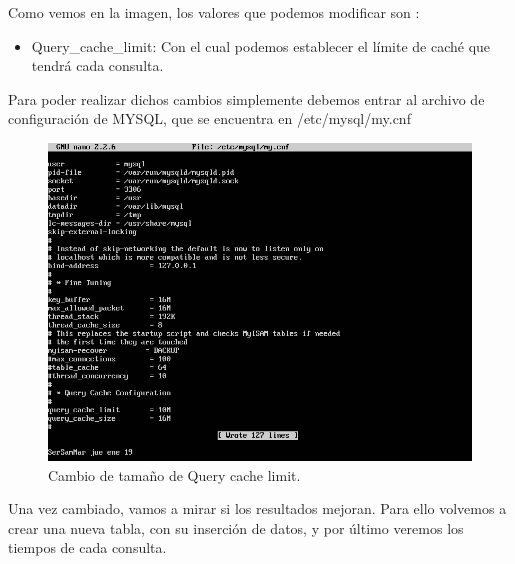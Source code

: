 Como vemos en la imagen, los valores que podemos modificar son :

\begin{itemize}
	\item Query\_cache\_limit: Con el cual podemos establecer el límite de caché que tendrá cada consulta.

\end{itemize}

Para poder realizar dichos cambios simplemente debemos entrar al archivo de configuración de MYSQL, que se encuentra en /etc/mysql/my.cnf 


\begin{figure}[H] %
	\centering
	\includegraphics[scale=0.5]{imagenes/edicion.png}  %
	\caption{Cambio de tamaño de Query cache limit.} \label{fig:figura21}
\end{figure}

Una vez cambiado, vamos a mirar si los resultados mejoran.
Para ello volvemos a crear una nueva tabla, con su inserción de datos, y por último veremos los tiempos de cada consulta.

